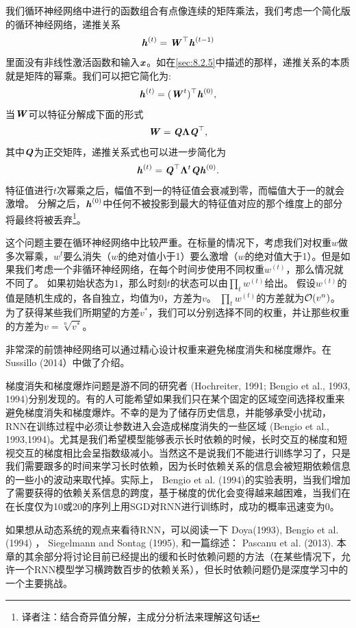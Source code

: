 我们循环神经网络中进行的函数组合有点像连续的矩阵乘法，我们考虑一个简化版的循环神经网络，递推关系
\begin{align}
 \boldsymbol{\mathit{h}}^{(t)} = \boldsymbol{\mathit{W}}^\top \boldsymbol{\mathit{h}}^{(t-1)}
\end{align}
里面没有非线性激活函数和输入$\boldsymbol{\mathit{x}}$。如在\ref{sec:8.2.5}中描述的那样，递推关系的本质就是矩阵的幂乘。我们可以把它简化为:
\begin{align}
 \boldsymbol{\mathit{h}}^{(t)} = (\boldsymbol{\mathit{W}}^t)^\top \boldsymbol{\mathit{h}}^{(0)},
\end{align}
当$\boldsymbol{\mathit{W}}$可以特征分解成下面的形式
\begin{align}
 \boldsymbol{\mathit{W}} = \boldsymbol{\mathit{Q}} \boldsymbol{\Lambda} \boldsymbol{\mathit{Q}}^\top,
\end{align}
其中$\boldsymbol{\mathit{Q}}$为正交矩阵，递推关系式也可以进一步简化为
\begin{align}
 \boldsymbol{\mathit{h}}^{(t)} = \boldsymbol{\mathit{Q}}^\top \boldsymbol{\Lambda}^t \boldsymbol{\mathit{Q}} \boldsymbol{\mathit{h}}^{(0)}.
\end{align}
特征值进行$t$次幂乘之后，幅值不到一的特征值会衰减到零，而幅值大于一的就会激增。
分解之后，$\boldsymbol{\mathit{h}}^{(0)}$中任何不被投影到最大的特征值对应的那个维度上的部分将最终将被丢弃\footnote{译者注：结合奇异值分解，主成分分析法来理解这句话}。

这个问题主要在循环神经网络中比较严重。在标量的情况下，考虑我们对权重$w$做多次幂乘，$w^t$要么消失（$w$的绝对值小于1）要么激增（$w$的绝对值大于1）。但是如果我们考虑一个非循环神经网络，在每个时间步使用不同权重$w^{(t)}$，那么情况就不同了。
如果初始状态为$1$，那么时刻$t$的状态可以由$\prod_t w^{(t)}$给出。
假设$w^{(t)}$的值是随机生成的，各自独立，均值为$0$，方差为$v$。
$\prod_t w^{(t)}$的方差就为$\mathcal{O}(v^n)$。
为了获得某些我们所期望的方差$v^*$，我们可以分别选择不同的权重，并让那些权重的方差为$v=\sqrt[n]{v^*}$。

非常深的前馈神经网络可以通过精心设计权重来避免梯度消失和梯度爆炸。在Sussillo (2014）中做了介绍。

梯度消失和梯度爆炸问题是游不同的研究者 (Hochreiter, 1991; Bengio et al., 1993, 1994)分别发现的。有的人可能希望如果我们只在某个固定的区域空间选择权重来避免梯度消失和梯度爆炸。不幸的是为了储存历史信息，并能够承受小扰动，RNN在训练过程中必须让参数进入会造成梯度消失的一些区域 (Bengio et al., 1993,1994)。尤其是我们希望模型能够表示长时依赖的时候，长时交互的梯度和短视交互的梯度相比会呈指数级减小。当然这不是说我们不能进行训练学习了，只是我们需要跟多的时间来学习长时依赖，因为长时依赖关系的信息会被短期依赖信息的一些小的波动来取代掉。实际上， Bengio et al. (1994)的实验表明，当我们增加了需要获得的依赖关系信息的跨度，基于梯度的优化会变得越来越困难，当我们在在长度仅为10或20的序列上用SGD对RNN进行训练时，成功的概率迅速变为0。

如果想从动态系统的观点来看待RNN，可以阅读一下 Doya(1993), Bengio et al. (1994) ， Siegelmann and Sontag (1995), 和一篇综述： Pascanu et al. (2013).
本章的其余部分将讨论目前已经提出的缓和长时依赖问题的方法（在某些情况下，允许一个RNN模型学习横跨数百步的依赖关系），但长时依赖问题仍是深度学习中的一个主要挑战。

